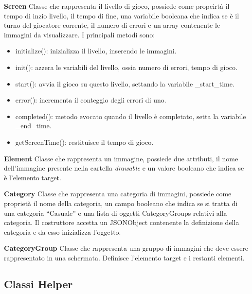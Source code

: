 \begin{description}
\item \textbf{Screen}
Classe che rappresenta il livello di gioco, possiede come propeirt\`{a} il tempo di inzio livello, il tempo di fine, una variabile booleana che indica se \`{e} il turno del giocatore corrente, il numero di errori e un array contenente le immagini da visualizzare. I principali metodi sono:
\begin{itemize}
\item initialize(): inizializza il livello, inserendo le immagini.
\item init(): azzera le variabili del livello, ossia numero di errori, tempo di gioco.
\item start(): avvia il gioco su questo livello, settando la variabile \_start\_time.
\item error(): incrementa il conteggio degli errori di uno.
\item completed(): metodo evocato quando il livello \`{e} completato, setta la variabile \_end\_time.
\item getScreenTime(): restituisce il tempo di gioco.
\end{itemize}
\item \textbf{Element}
\noindent Classe che rappresenta un immagine, possiede due attributi, il nome dell'immagine presente nella cartella \emph{drawable} e un valore booleano che indica se \`{e} l'elemento target.
\item \textbf{Category}
Classe che rappresenta una categoria di immagini, possiede come propriet\`{a} il nome della categoria, un campo booleano che indica se si tratta di una categoria ``Casuale'' e una lista di oggetti CategoryGroups relativi alla categoria. Il costruttore accetta un JSONObject contenente la definizione della categoria e da esso inizializza l'oggetto.
\item \textbf{CategoryGroup}
Classe che rappresenta una gruppo di immagini che deve essere rappresentato in una schermata. Definisce l'elemento target e i restanti elementi.
\end{description}

\subsection{Classi Helper}

